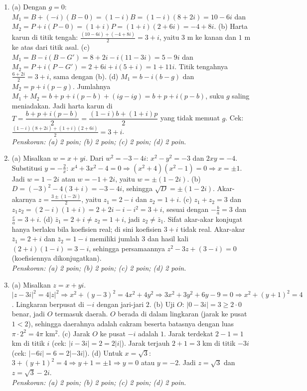 \documentclass[a4paper,11pt]{article}
\begin{document}
\small\begin{enumerate}[leftmargin=2em,itemsep=3pt,topsep=2pt]
\item[\textbf{1.}] (a) Dengan $g=0$: $M_1=B+(-i)(B-0)=(1-i)B=(1-i)(8+2i)=10-6i$ dan $M_2=P+i(P-0)=(1+i)P=(1+i)(2+6i)=-4+8i$. (b) Harta karun di titik tengah: $\frac{(10-6i)+(-4+8i)}{2}=3+i$, yaitu $3$ m ke kanan dan $1$ m ke atas dari titik asal. (c) $M_1=B-i(B-G')=8+2i-i(11-3i)=5-9i$ dan $M_2=P+i(P-G')=2+6i+i(5+i)=1+11i$. Titik tengahnya $\frac{6+2i}{2}=3+i$, sama dengan (b). (d) $M_1=b-i(b-g)$ dan $M_2=p+i(p-g)$. Jumlahnya $M_1+M_2=b+p+i(p-b)+(ig-ig)=b+p+i(p-b)$, suku $g$ saling meniadakan. Jadi harta karun di $T=\dfrac{b+p+i(p-b)}{2}=\dfrac{(1-i)b+(1+i)p}{2}$ yang tidak memuat $g$. Cek: $\frac{(1-i)(8+2i)+(1+i)(2+6i)}{2}=3+i$. \\ \textit{Penskoran: (a) 2 poin; (b) 2 poin; (c) 2 poin; (d) 2 poin.}
\item[\textbf{2.}] (a) Misalkan $w=x+yi$. Dari $w^2=-3-4i$: $x^2-y^2=-3$ dan $2xy=-4$. Substitusi $y=-\frac2x$: $x^4+3x^2-4=0\Rightarrow(x^2+4)(x^2-1)=0\Rightarrow x=\pm1$. Jadi $w=1-2i$ atau $w=-1+2i$, yaitu $w=\pm(1-2i)$. (b) $D=(-3)^2-4(3+i)=-3-4i$, sehingga $\sqrt D=\pm(1-2i)$. Akar-akarnya $z=\frac{3\pm(1-2i)}{2}$, yaitu $z_1=2-i$ dan $z_2=1+i$. (c) $z_1+z_2=3$ dan $z_1z_2=(2-i)(1+i)=2+2i-i-i^2=3+i$, sesuai dengan $-\frac ba=3$ dan $\frac ca=3+i$. (d) $\bar z_1=2+i\neq z_2=1+i$, jadi $z_2\neq\bar z_1$. Sifat akar-akar konjugat hanya berlaku bila koefisien real; di sini koefisien $3+i$ tidak real. Akar-akar $\bar z_1=2+i$ dan $\bar z_2=1-i$ memiliki jumlah $3$ dan hasil kali $(2+i)(1-i)=3-i$, sehingga persamaannya $z^2-3z+(3-i)=0$ (koefisiennya dikonjugatkan). \\ \textit{Penskoran: (a) 2 poin; (b) 2 poin; (c) 2 poin; (d) 2 poin.}
\item[\textbf{3.}] (a) Misalkan $z=x+yi$. $|z-3i|^2=4|z|^2\Rightarrow x^2+(y-3)^2=4x^2+4y^2\Rightarrow3x^2+3y^2+6y-9=0\Rightarrow x^2+(y+1)^2=4$. Lingkaran berpusat di $-i$ dengan jari-jari $2$. (b) Uji $O$: $|0-3i|=3\ge2\cdot0$ benar, jadi $O$ termasuk daerah. $O$ berada di dalam lingkaran (jarak ke pusat $1<2$), sehingga daerahnya adalah cakram beserta batasnya dengan luas $\pi\cdot2^2=4\pi$ km$^2$. (c) Jarak $O$ ke pusat $-i$ adalah $1$. Jarak terdekat $2-1=1$ km di titik $i$ (cek: $|i-3i|=2=2|i|$). Jarak terjauh $2+1=3$ km di titik $-3i$ (cek: $|-6i|=6=2|-3i|$). (d) Untuk $x=\sqrt3$: $3+(y+1)^2=4\Rightarrow y+1=\pm1\Rightarrow y=0$ atau $y=-2$. Jadi $z=\sqrt3$ dan $z=\sqrt3-2i$. \\ \textit{Penskoran: (a) 2 poin; (b) 2 poin; (c) 2 poin; (d) 2 poin.}

\end{enumerate}
\end{document}
